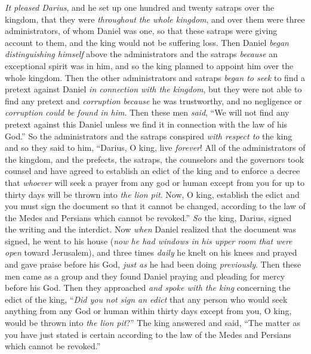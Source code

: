 \begin{biblechapter} %
 \textit{It pleased Darius}, and he set up one hundred and twenty satraps over the kingdom, that they were \textit{throughout the whole kingdom},
\verse and over them were three administrators, of whom Daniel was one, so that these satraps were giving account to them, and the king would not be suffering loss.
\verse Then Daniel \textit{began distinguishing himself} above the administrators and the satraps \textit{because} an exceptional spirit was in him, and so the king planned to appoint him over the whole kingdom.
\verse Then the other administrators and satraps \textit{began to seek} to find a pretext against Daniel \textit{in connection with the kingdom}, but they were not able to find any pretext and \textit{corruption} \textit{because} he was trustworthy, and no negligence or \textit{corruption} \textit{could be found in him}.
\verse Then these men \textit{said}, “We will not find any pretext against this Daniel unless we find it in connection with the law of his God.”
\verse So the administrators and the satraps conspired \textit{with respect to} the king and so they said to him, “Darius, O king, live \textit{forever}!
\verse All of the administrators of the kingdom, and the prefects, the satraps, the counselors and the governors took counsel and have agreed to establish an edict of the king and to enforce a decree that \textit{whoever} will seek a prayer from any god or human except from you for up to thirty days will be thrown into \textit{the lion pit}.
\verse Now, O king, establish the edict and you must sign the document so that it cannot be changed, according to the law of the Medes and Persians which cannot be revoked.”
\verse \textit{So} the king, Darius, signed the writing and the interdict.
\verse Now \textit{when} Daniel realized that the document was signed, he went to his house (\textit{now he had windows in his upper room that were open} toward Jerusalem), and three times \textit{daily} he knelt on his knees and prayed and gave praise before his God, \textit{just as} he had been doing \textit{previously}.
\verse Then these men came as a group and they found Daniel praying and pleading for mercy before his God.
\verse Then they approached \textit{and spoke with the king} concerning the edict of the king, “\textit{Did you not sign an edict} that any person who would seek anything from any God or human within thirty days except from you, O king, would be thrown into \textit{the lion pit}?” The king answered and said, “The matter as you have just stated is certain according to the law of the Medes and Persians which cannot be revoked.”

\end{biblechapter}
